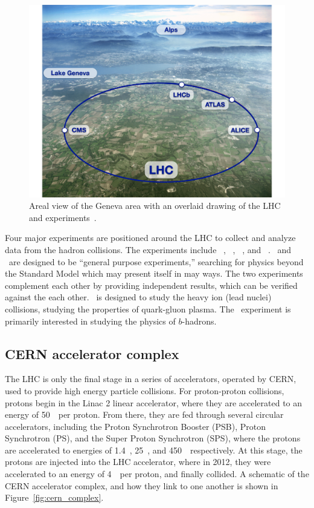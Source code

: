 \begin{figure}[ht]
  \centering
  \includegraphics[width=\textwidth, clip=true, trim=0 0 1cm 0]
    {figs/lhc/lhc_aerial.pdf}
  \caption{
    Areal view of the Geneva area with an overlaid drawing of the LHC
    and experiments~\cite{lhc_aerial}.
  }
  \label{fig:lhc_aerial}
\end{figure}

Four major experiments are positioned around the LHC to collect and analyze
data from the hadron collisions.
The experiments include \atlas~\cite{cern-jinst-atlas},
\cms~\cite{cern-jinst-cms}, \alice~\cite{cern-jinst-alice,}, and
\lhcb~\cite{cern-jinst-lhcb}.
\atlas\ and \cms\ are designed to be ``general purpose experiments,'' searching
for physics beyond the Standard Model which may present itself in may ways.
The two experiments complement each other by providing independent results,
which can be verified against the each other.
\alice\ is designed to study the heavy ion (lead nuclei) collisions, studying
the properties of quark-gluon plasma.
The \lhcb\ experiment is primarily interested in studying the physics of
$b$-hadrons.

\FloatBarrier
\subsection{CERN accelerator complex}
\label{sec:accelerator_complex}

The LHC is only the final stage in a series of accelerators, operated by CERN,
used to provide high energy particle collisions.
For proton-proton collisions, protons begin in the Linac 2 linear
accelerator, where they are accelerated to an energy of 50~\MeV\ per proton.
From there, they are fed through several circular accelerators, including
the Proton Synchrotron Booster (PSB), Proton Synchrotron (PS), and the Super
Proton Synchrotron (SPS), where the protons are accelerated to energies of
1.4~\GeV, 25~\GeV, and 450~\GeV\ respectively.
At this stage, the protons are injected into the LHC accelerator, where 
in 2012, they were accelerated to an energy of 4~\TeV\ per proton, and finally
collided.
A schematic of the CERN accelerator complex, and how they link to one another
is shown in Figure~\ref{fig:cern_complex}.

